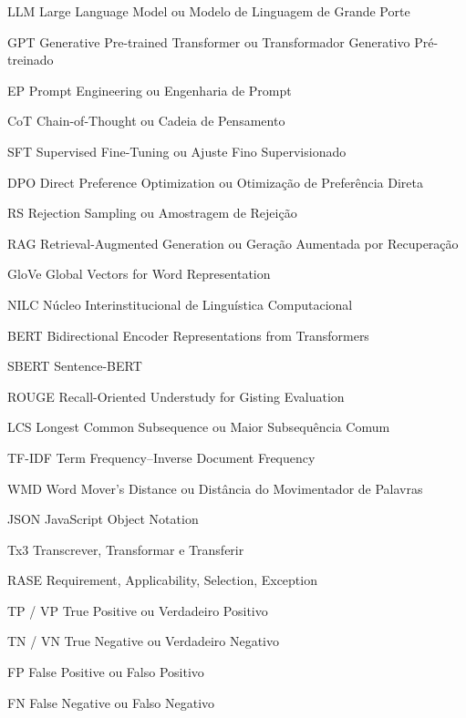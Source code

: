 \begin{siglas}
    \item[LLM]{Large Language Model ou Modelo de Linguagem de Grande Porte}
    \item[GPT]{Generative Pre-trained Transformer ou Transformador Generativo Pré-treinado}
    \item[EP]{Prompt Engineering ou Engenharia de Prompt}
    \item[CoT]{Chain-of-Thought ou Cadeia de Pensamento}
    \item[SFT]{Supervised Fine-Tuning ou Ajuste Fino Supervisionado}
    \item[DPO]{Direct Preference Optimization ou Otimização de Preferência Direta}
    \item[RS]{Rejection Sampling ou Amostragem de Rejeição}
    \item[RAG]{Retrieval-Augmented Generation ou Geração Aumentada por Recuperação}

    \item[GloVe]{Global Vectors for Word Representation}
    \item[NILC]{Núcleo Interinstitucional de Linguística Computacional}

    \item[BERT]{Bidirectional Encoder Representations from Transformers}
    \item[SBERT]{Sentence-BERT}
    \item[ROUGE]{Recall-Oriented Understudy for Gisting Evaluation}
    \item[LCS]{Longest Common Subsequence ou Maior Subsequência Comum}
    \item[TF-IDF]{Term Frequency--Inverse Document Frequency}
    \item[WMD]{Word Mover's Distance ou Distância do Movimentador de Palavras}

    \item[JSON]{JavaScript Object Notation}
    \item[Tx3]{Transcrever, Transformar e Transferir}
    \item[RASE]{Requirement, Applicability, Selection, Exception}

    \item[TP / VP]{True Positive ou Verdadeiro Positivo}
    \item[TN / VN]{True Negative ou Verdadeiro Negativo}
    \item[FP]{False Positive ou Falso Positivo}
    \item[FN]{False Negative ou Falso Negativo}


\end{siglas}
